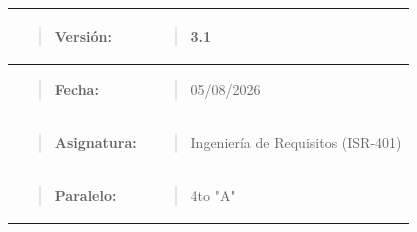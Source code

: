 \documentclass[
]{article}
\newcounter{none} %
\begin{document}
{\def\LTcaptype{none} %
\begin{longtable}[]{@{}
  >{\raggedright\arraybackslash}p{}
  >{\raggedright\arraybackslash}p{}@{}}
\toprule\noalign{}
\begin{minipage}[b]{\linewidth}\raggedright
\begin{quote}
\textbf{Versión:}
\end{quote}
\end{minipage} & \begin{minipage}[b]{\linewidth}\raggedright
\begin{quote}
3.1
\end{quote}
\end{minipage} \\
\midrule\noalign{}
\endhead
\bottomrule\noalign{}
\endlastfoot
\begin{minipage}[t]{\linewidth}\raggedright
\begin{quote}
\textbf{Fecha:}
\end{quote}
\end{minipage} & \begin{minipage}[t]{\linewidth}\raggedright
\begin{quote}
05/08/2026
\end{quote}
\end{minipage} \\
\begin{minipage}[t]{\linewidth}\raggedright
\begin{quote}
\textbf{Asignatura:}
\end{quote}
\end{minipage} & \begin{minipage}[t]{\linewidth}\raggedright
\begin{quote}
Ingeniería de Requisitos (ISR-401)
\end{quote}
\end{minipage} \\
\begin{minipage}[t]{\linewidth}\raggedright
\begin{quote}
\textbf{Paralelo:}
\end{quote}
\end{minipage} & \begin{minipage}[t]{\linewidth}\raggedright
\begin{quote}
4to "A"
\end{quote}
\end{minipage} \\

\end{longtable}}
\end{document}
